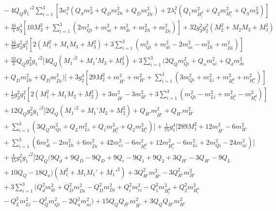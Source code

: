 \documentclass[preprint,amsmath,amssymb,aps,superscriptaddress,prd,showpacs,floatfix,nofootinbib]{revtex4-1}
\begin{document}
\begin{subequations}
\begin{align}
&{}-4Q_Qg_1'^2\sum_{i=1}^3\left [ 3\kappa_i^2\left ( Q_Sm_S^2+Q_Dm_{Di}^2+Q_{\overline{D}}m_{\overline{D}i}^2\right )+2\lambda_i^2\left ( Q_1m_{H_i^d}^2+Q_2m_{H_i^u}^2+Q_Sm_S^2\right )\right ]\nonumber\\
&{}+\frac{16}{3}g_3^4\left [ 10M_3^2+\sum_{i=1}^3\left ( 2m_{Qi}^2+m_{ui}^2+m_{di}^2+m_{Di}^2+m_{\overline{D}i}^2\right )\right ]+32g_3^2g_2^2\left ( M_2^2+M_2M_3+M_3^2\right )\nonumber\\
&{}+\frac{16}{45}g_3^2g_1^2\left [ 2\left ( M_1^2+M_1M_3+M_3^2\right )+3\sum_{i=1}^3\left ( m_{Qi}^2+m_{di}^2-2m_{ui}^2-m_{Di}^2+m_{\overline{D}i}^2\right )\right ]\nonumber\\
&{}+\frac{32}{3}Q_Qg_3^2g_1'^2\bigg [ 4Q_Q\left ( M_1'^2+M_1'M_3+M_3^2 \right )+3\sum_{i=1}^3\big ( 2Q_Qm_{Qi}^2+Q_um_{ui}^2+Q_dm_{di}^2\nonumber\\
&{}+Q_Dm_{Di}^2+Q_{\overline{D}}m_{\overline{D}i}^2 \big )\bigg ]+3g_2^4\left [ 29M_2^2+m_{\overline{H'}}^2+m_{H'}^2+\sum_{i=1}^3\left ( 3m_{Qi}^2+m_{Li}^2+m_{H_i^d}^2+m_{H_i^u}^2\right )\right ]\nonumber\\
&{}+\frac{1}{5}g_2^2g_1^2\left [ 2\left ( M_1^2+M_1M_2+M_2^2 \right )+3m_{\overline{H'}}^2-3m_{H'}^2+3\sum_{i=1}^3\left ( m_{Qi}^2-m_{Li}^2+m_{H_i^u}^2-m_{H_i^d}^2\right )\right ]\nonumber\\
&{}+12Q_Qg_2^2g_1'^2\bigg [ 2Q_Q\left ( M_1'^2+M_1'M_2+M_2^2\right )+Q_{\overline{H'}}m_{\overline{H'}}^2+Q_{H'}m_{H'}^2\nonumber\\
&{}+\sum_{i=1}^3\left ( 3Q_Qm_{Qi}^2+Q_Lm_{Li}^2+Q_1m_{H_i^d}^2+Q_2m_{H_i^u}^2\right )\bigg ]+\frac{1}{75}g_1^4\bigg [ 289M_1^2+12m_{\overline{H'}}^2-6m_{H'}^2\nonumber\\
&{}+\sum_{i=1}^3\left ( 6m_{di}^2-2m_{Di}^2+6m_{\overline{D}i}^2+42m_{ei}^2-6m_{H_i^d}^2+12m_{H_i^u}^2-6m_{Li}^2+2m_{Qi}^2-24m_{ui}^2\right )\bigg ]\nonumber\\
&{}+\frac{4}{15}g_1^2g_1'^2\bigg [ 2Q_Q\big ( 9Q_d+9Q_{\overline{D}}-9Q_D+9Q_e-9Q_1+9Q_2+3Q_{\overline{H'}}-3Q_{H'}-9Q_L\nonumber\\
&{}+10Q_Q-18Q_u\big )\left ( M_1^2+M_1M_1'+M_1'^2\right )+3Q_{\overline{H'}}^2m_{\overline{H'}}^2-3Q_{H'}^2m_{H'}^2\nonumber\\
&{}+3\sum_{i=1}^3\big ( Q_d^2m_{di}^2+Q_{\overline{D}}^2m_{\overline{D}i}^2-Q_D^2m_{Di}^2+Q_e^2m_{ei}^2-Q_1^2m_{H_i^d}^2+Q_2^2m_{H_i^u}^2\nonumber\\
&{}-Q_L^2m_{Li}^2-Q_Q^2m_{Qi}^2-2Q_u^2m_{ui}^2\big )+15Q_QQ_{\overline{H'}}m_{\overline{H'}}^2+3Q_QQ_{H'}m_{H'}^2\nonumber\\

\end{align}
\end{subequations}
\end{document}

